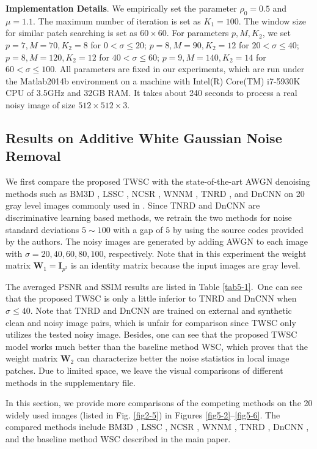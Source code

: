 \textbf{Implementation Details}. We empirically set the parameter $\rho_{0}=0.5$ and $\mu=1.1$. The maximum number of iteration is set as $K_{1}=100$. The window size for similar patch searching is set as $60\times60$. For parameters $p,M,K_{2}$, we set $p=7,M=70,K_{2}=8$ for $0<\sigma\le20$; $p=8,M=90,K_{2}=12$ for $20<\sigma\le40$; $p=8,M=120,K_{2}=12$ for $40<\sigma\le60$; $p=9,M=140,K_{2}=14$ for $60<\sigma\le100$. All parameters are fixed in our experiments, which are run under the Matlab2014b environment on a machine with Intel(R) Core(TM) i7-5930K CPU of 3.5GHz and 32GB RAM. It takes about 240 seconds to process a real noisy image of size $512\times512\times3$.


\subsection{Results on Additive White Gaussian Noise Removal}

We first compare the proposed TWSC with the state-of-the-art AWGN denoising methods such as BM3D \cite{bm3d}, LSSC \cite{lssc}, NCSR \cite{ncsr}, WNNM \cite{wnnm}, TNRD \cite{tnrd}, and DnCNN \cite{dncnn} on 20 gray level images commonly used in \cite{bm3d}. Since TNRD and DnCNN are discriminative learning based methods, we retrain the two methods for noise standard deviations $5\sim100$ with a gap of $5$ by using the source codes provided by the authors. The noisy images are generated by adding AWGN to each image with $\sigma=20,40,60,80,100$, respectively. Note that in this experiment the weight matrix $\bm{W}_{1}=\bm{I}_{p^2}$ is an identity matrix because the input images are gray level.

The averaged PSNR and SSIM \cite{ssim} results are listed in Table \ref{tab5-1}.\ One can see that the proposed TWSC is only a little inferior to TNRD and DnCNN when $\sigma\le40$. Note that TNRD and DnCNN are trained on external and synthetic clean and noisy image pairs, which is unfair for comparison since TWSC only utilizes the tested noisy image. Besides, one can see that the proposed TWSC model works much better than the baseline method WSC, which proves that the weight matrix $\bm{W}_{2}$ can characterize better the noise statistics in local image patches. Due to limited space, we leave the visual comparisons of different methods in the supplementary file.

In this section, we provide more comparisons of the competing methods on the 20 widely used images (listed in Fig. \ref{fig2-5}) in Figures \ref{fig5-2}--\ref{fig5-6}. The compared methods include BM3D \cite{bm3d}, LSSC \cite{lssc}, NCSR \cite{ncsr}, WNNM \cite{wnnm}, TNRD \cite{tnrd}, DnCNN \cite{dncnn}, and the baseline method WSC described in the main paper.
 
